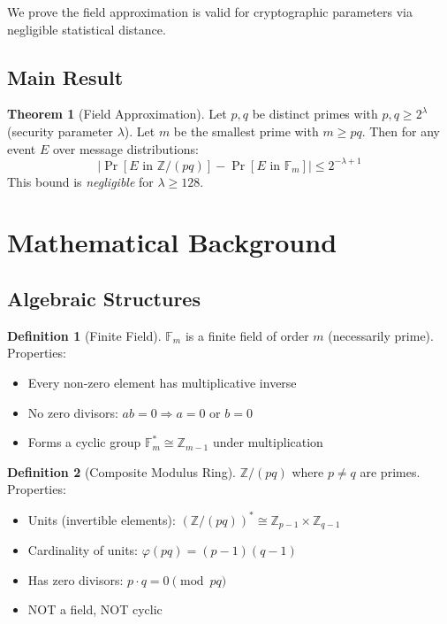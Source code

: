 \documentclass[11pt]{article}
\theoremstyle{definition}
\newtheorem{definition}{Definition}
\newtheorem{theorem}{Theorem}
\begin{document}
We prove the field approximation is valid for cryptographic parameters via negligible statistical distance.

\subsection{Main Result}

\begin{theorem}[Field Approximation]
Let $p,q$ be distinct primes with $p,q \geq 2^\lambda$ (security parameter $\lambda$). 
Let $m$ be the smallest prime with $m \geq pq$. Then for any event $E$ over message 
distributions:
\[
\left| \Pr[E \text{ in } \mathbb{Z}/(pq)] - \Pr[E \text{ in } \mathbb{F}_m] \right| 
\leq 2^{-\lambda+1}
\]
This bound is \emph{negligible} for $\lambda \geq 128$.
\end{theorem}

\section{Mathematical Background}

\subsection{Algebraic Structures}

\begin{definition}[Finite Field]
$\mathbb{F}_m$ is a finite field of order $m$ (necessarily prime). Properties:
\begin{itemize}
\item Every non-zero element has multiplicative inverse
\item No zero divisors: $ab = 0 \Rightarrow a = 0 \text{ or } b = 0$
\item Forms a cyclic group $\mathbb{F}_m^* \cong \mathbb{Z}_{m-1}$ under multiplication
\end{itemize}
\end{definition}

\begin{definition}[Composite Modulus Ring]
$\mathbb{Z}/(pq)$ where $p \neq q$ are primes. Properties:
\begin{itemize}
\item Units (invertible elements): $(\mathbb{Z}/(pq))^* \cong \mathbb{Z}_{p-1} \times \mathbb{Z}_{q-1}$
\item Cardinality of units: $\varphi(pq) = (p-1)(q-1)$
\item Has zero divisors: $p \cdot q = 0 \pmod{pq}$
\item NOT a field, NOT cyclic
\end{itemize}
\end{definition}
\end{document}
